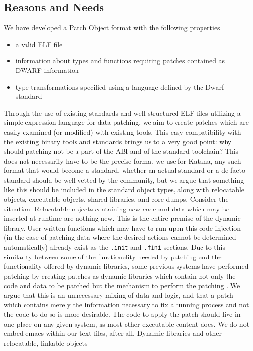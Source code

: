 \documentclass[a4paper,12pt]{article}
\begin{document}
\subsection{Reasons and Needs}
We have developed a Patch Object format with the following properties
\begin{itemize}
 \item a valid ELF file
 \item information about types and functions requiring patches contained
   as DWARF information
 \item type transformations specified using a language defined by the
   Dwarf standard
\end{itemize}
Through the use of existing standards and well-structured ELF files
utilizing a simple expression language for data patching, we aim to
create patches which are easily examined (or modified) with existing
tools. This easy compatibility with the existing binary tools and
standards brings us to a very good point: why should patching not be a
part of the ABI and of the standard toolchain? This does not
necessarily have to be the precise format we use for Katana, any such
format that would become a standard, whether an actual standard or a
de-facto standard should be well vetted by the community, but we argue
that something like this should be included in the standard object
types, along with relocatable objects, executable objects, shared
libraries, and core dumps. Consider the situation. Relocatable objects
containing new code and data which may be inserted at runtime are
nothing new. This is the entire premise of the dynamic
library. User-written functions which may have to run upon this code
injection (in the case of patching data where the desired actions
cannot be determined automatically) already exist as the
\texttt{.init} and \texttt{.fini} sections. Due to this similarity
between some of the functionality needed by patching and the
functionality offered by dynamic
libraries, some previous systems have performed patching by creating
patches as dynamic libraries which contain not only the code and data
to be patched but the mechanism to perform the patching \cite{ginseng}
\cite{polus}. We argue that
this is an unnecessary mixing of data and logic, and that a patch
which contains merely the information necessary to fix a running
process and not the code to do so is more desirable. The code to apply
the patch should live in one place on any given system, as most other
executable content does. We do not embed emacs within our text files,
after all. Dynamic libraries and other relocatable, linkable objects
\end{document}
